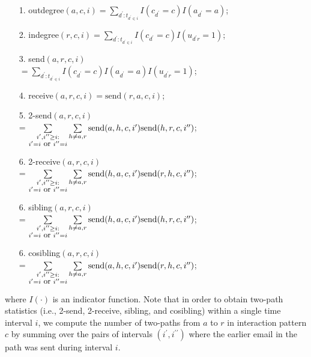 \documentclass{article}
\begin{document}
\begin{itemize}
	\item[1.] outdegree$(a,c,i)=\sum\limits_{d^\prime:t_{d^\prime \in i}} I(c_{d^\prime} = c)I(a_{d^\prime} = a)$;
	\item[2.] indegree$(r,c,i)=\sum\limits_{d^\prime:t_{d^\prime \in i}} I(c_{d^\prime} = c)I(u_{d^\prime r} = 1)$;
	\item[3.] send$(a,r,c,i)$\\
	$=\sum\limits_{d^\prime:t_{d^\prime \in i}} I(c_{d^\prime} = c)I(a_{d^\prime} = a)I(u_{d^\prime r} = 1)$;
	\item[4.] receive$(a,r,c,i)=\mbox{send}(r,a,c,i)$;
	\item[5.] 2-send$(a,r,c,i) $\\= $\sum\limits_{\substack{i^\prime, i^{\prime\prime}\geq i:\\i^\prime = i \mbox{ \small or }i^{\prime\prime}=i}}\sum\limits_{h \neq a, r} \mbox{send}(a,h,c,i^\prime)\mbox{send}(h,r,c,i^{\prime\prime})$;
	\item[6.] 2-receive$(a,r,c,i) $\\= $\sum\limits_{\substack{i^\prime, i^{\prime\prime}\geq i:\\i^\prime = i \mbox{ \small or }i^{\prime\prime}=i}}\sum\limits_{h \neq a, r} \mbox{send}(h,a,c,i^\prime)\mbox{send}(r,h,c,i^{\prime\prime})$;
	\item[6.] sibling$(a,r,c,i) $\\= $\sum\limits_{\substack{i^\prime, i^{\prime\prime}\geq i:\\i^\prime = i \mbox{ \small or }i^{\prime\prime}=i}}\sum\limits_{h \neq a, r} \mbox{send}(h,a,c,i^\prime)\mbox{send}(h,r,c,i^{\prime\prime})$;
	\item[6.] cosibling$(a,r,c,i) $\\= $\sum\limits_{\substack{i^\prime, i^{\prime\prime}\geq i:\\i^\prime = i \mbox{ \small or }i^{\prime\prime}=i}}\sum\limits_{h \neq a, r} \mbox{send}(a,h,c,i^\prime)\mbox{send}(r,h,c,i^{\prime\prime})$;
\end{itemize}
where $I(\cdot)$ is an indicator function. Note that in order to obtain two-path statistics (i.e., 2-send, 2-receive, sibling, and cosibling) within a single time interval $i$, we compute the number of two-paths from $a$ to $r$ in interaction pattern $c$ by summing over the pairs of intervals $(i^\prime, i^{\prime\prime})$ where the earlier email in the path was sent during interval $i$. 
\end{document}
